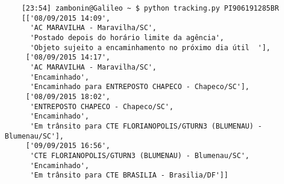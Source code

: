 \documentclass{article}
\begin{document}
\begin{verbatim}
    [23:54] zambonin@Galileo ~ $ python tracking.py PI906191285BR
    [['08/09/2015 14:09',
      'AC MARAVILHA - Maravilha/SC',
      'Postado depois do horário limite da agência',
      'Objeto sujeito a encaminhamento no próximo dia útil  '],
     ['08/09/2015 14:17',
      'AC MARAVILHA - Maravilha/SC',
      'Encaminhado',
      'Encaminhado para ENTREPOSTO CHAPECO - Chapeco/SC'],
     ['08/09/2015 18:02',
      'ENTREPOSTO CHAPECO - Chapeco/SC',
      'Encaminhado',
      'Em trânsito para CTE FLORIANOPOLIS/GTURN3 (BLUMENAU) - Blumenau/SC'],
     ['09/09/2015 16:56',
      'CTE FLORIANOPOLIS/GTURN3 (BLUMENAU) - Blumenau/SC',
      'Encaminhado',
      'Em trânsito para CTE BRASILIA - Brasilia/DF']]
\end{verbatim}
\end{document}
